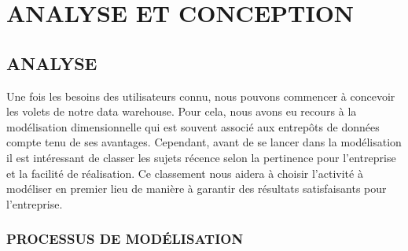 \chapter{ANALYSE ET CONCEPTION}

\section{ANALYSE}
Une fois les besoins des utilisateurs connu, nous pouvons commencer à concevoir les volets de notre data warehouse. Pour cela, nous avons eu recours à la modélisation dimensionnelle qui est souvent associé aux entrepôts de données compte tenu de ses avantages.
Cependant, avant de se lancer dans la modélisation il est intéressant de classer les sujets récence selon la pertinence pour l’entreprise et la facilité de réalisation. Ce classement nous aidera à choisir l’activité à modéliser en premier lieu de manière à garantir des résultats satisfaisants pour l’entreprise.\\

\subsection{PROCESSUS DE MODÉLISATION}
 
